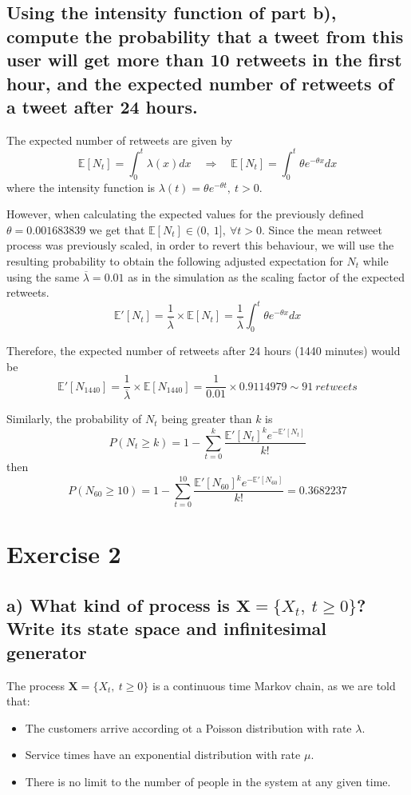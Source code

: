 \documentclass[11pt, a4paper]{article}
\begin{document}
\subsection{Using the intensity function of part b), compute the probability that a tweet from this user will get more than 10 retweets in the first hour, and the expected number of retweets of a tweet after 24 hours.}

The expected number of retweets are given by 
\[\mathbb{E}[N_t] = \int^t_0\lambda(x)dx \quad \Longrightarrow \quad \mathbb{E}[N_t] = \int^t_0 \theta e^{-\theta x} dx\]
where the intensity function is $ \lambda (t) = \theta e^{-\theta t},\ t>0$. 

However, when calculating the expected values for the previously defined $\theta = 0.001683839$ we get that $\mathbb{E}[N_t] \in (0,\ 1],\ \forall t>0$. Since the mean retweet process was previously scaled, in order to revert this behaviour, we will use the resulting probability to obtain the following adjusted expectation for $N_t$ while using the same $\overline\lambda = 0.01$ as in the simulation as the scaling factor of the expected retweets. 
\[\mathbb{E}'[N_t] = \frac{1}{\overline\lambda} \times \mathbb{E}[N_t] = \frac{1}{\overline\lambda}\int^t_0 \theta e^{-\theta x} dx\]

Therefore, the expected number of retweets after 24 hours (1440 minutes) would be
\[\mathbb{E}'[N_{1440}] = \frac{1}{\overline\lambda} \times \mathbb{E}[N_{1440}] = \frac{1}{0.01} \times 0.9114979 \sim 91\ retweets \] 

Similarly, the probability of $N_t$ being greater than $k$ is
\[P(N_{t} \geq k) = 1 - \sum_{t=0}^{k}\frac{\mathbb{E}'[N_{t}]^k e^{-\mathbb{E}'[N_{t}]}}{k!}\]
then
\[P(N_{60} \geq 10) = 1 - \sum_{t=0}^{10}\frac{\mathbb{E}'[N_{60}]^k e^{-\mathbb{E}'[N_{60}]}}{k!} = 0.3682237\]

\section{Exercise 2}
\subsection*{a) What kind of process is $\bm{X} = \{X_t, \ t\geq 0\}$? Write its state space and infinitesimal generator}
The process $\bm{X} = \{X_t, \ t\geq 0\}$ is a continuous time Markov chain, as we are told that:
\begin{itemize}
	\item The customers arrive according ot a Poisson distribution with rate $\lambda$.
	\item Service times have an exponential distribution with rate $\mu$.
	\item There is no limit to the number of people in the system at any given time.
\end{itemize}
\end{document}
